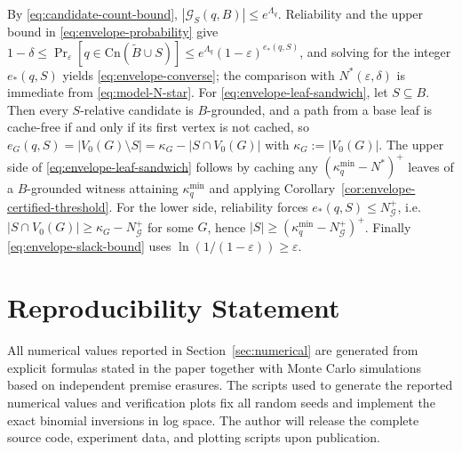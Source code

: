 \documentclass[journal]{IEEEtran}
\makeatletter
\newcommand{\Cn}{\text{Cn}}
\numberwithin{equation}{section}
\renewenvironment{proof}[1][\proofname]{\par
  \pushQED{\qed}%
  \normalfont \topsep6\p@\@plus6\p@\relax
  \trivlist
  \item[\hskip\labelsep
        \itshape
    #1\@addpunct{.}]\ignorespaces
}{%
  \popQED\endtrivlist\@endpefalse
}
\makeatother
\begin{document}
\begin{proof}
By \eqref{eq:candidate-count-bound},
\(|\mathcal G_S(q,B)|\le e^{\Lambda_q}\).  Reliability and the upper bound in
\eqref{eq:envelope-probability} give
\(1-\delta\le\Pr_{\varepsilon}[q\in\Cn(\widetilde B\cup S)]
\le e^{\Lambda_q}(1-\varepsilon)^{e_*(q,S)}\),
and solving for the integer \(e_*(q,S)\) yields
\eqref{eq:envelope-converse}; the comparison with \(N^*(\varepsilon,\delta)\)
is immediate from \eqref{eq:model-N-star}.  For
\eqref{eq:envelope-leaf-sandwich}, let \(S\subseteq B\).  Then every
\(S\)-relative candidate is \(B\)-grounded, and a path from a base leaf is
cache-free if and only if its first vertex is not cached, so
\(e_G(q,S)=|V_0(G)\setminus S|=\kappa_G-|S\cap V_0(G)|\) with
\(\kappa_G:=|V_0(G)|\).  The upper side of
\eqref{eq:envelope-leaf-sandwich} follows by caching any
\((\kappa_q^{\min}-N^*)^+\) leaves of a \(B\)-grounded witness attaining
\(\kappa_q^{\min}\) and applying
Corollary~\ref{cor:envelope-certified-threshold}.  For the lower side,
reliability forces \(e_*(q,S)\le N^+_{\mathcal G}\), i.e.\
\(|S\cap V_0(G)|\ge\kappa_G-N^+_{\mathcal G}\) for some \(G\), hence
\(|S|\ge(\kappa_q^{\min}-N^+_{\mathcal G})^+\).
Finally \eqref{eq:envelope-slack-bound} uses
\(\ln(1/(1-\varepsilon))\ge\varepsilon\).
\end{proof}

\section*{Reproducibility Statement}
All numerical values reported in Section~\ref{sec:numerical} are generated from
explicit formulas stated in the paper together with Monte Carlo simulations
based on independent premise erasures.  The scripts used to generate the reported numerical
values and verification plots fix all random seeds and implement the exact
binomial inversions in log space.  The author will release the complete source
code, experiment data, and plotting scripts upon publication.





\vfill
\end{document}
